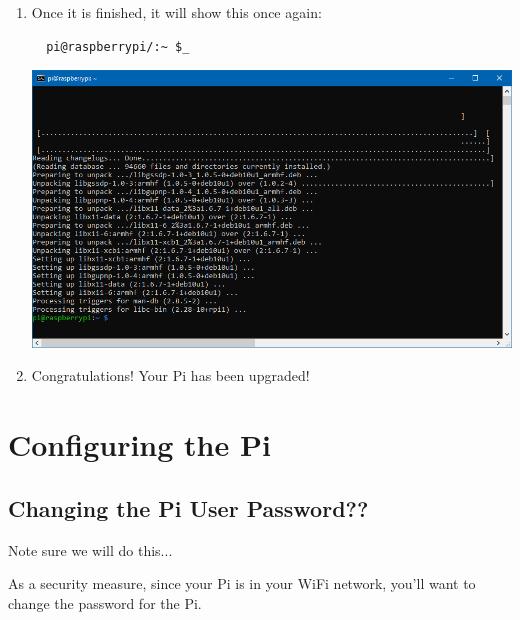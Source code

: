 \documentclass{article}
\begin{document}
\begin{enumerate}
  \item Once it is finished, it will show this once again:
  \begin{lstlisting}
  pi@raspberrypi/:~ $_ 
  \end{lstlisting}
  \includegraphics[width=1.00\textwidth]{aptupgradedone}
  \item Congratulations! Your Pi has been upgraded!
\end{enumerate}

\section{Configuring the Pi}

\subsection{Changing the Pi User Password??}

Note sure we will do this...

As a security measure, since your Pi is in your WiFi network, you'll want to change the password for the Pi.
\end{document}
